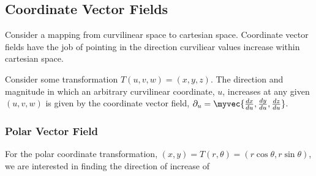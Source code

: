 \documentclass[11pt]{article}
\newenvironment{mybox}
{\begin{tcolorbox}[colback=red!5!white,colframe=red!75!black]}
{\end{tcolorbox}}
\begin{document}
\subsection{Coordinate Vector Fields}
Consider a mapping from curvilinear space to cartesian space. Coordinate vector fields have the job of pointing in the direction curviliear values increase within cartesian space.
\begin{mybox}
    Consider some transformation $T(u,v,w)=(x,y,z)$. The direction and magnitude in which an arbitrary curvilinear coordinate, $u$, increases at any given $(u,v,w)$ is given by the coordinate vector field, $\partial_u = \myvec{\frac{dx}{du},\frac{dy}{du},\frac{dz}{du}}$.
\end{mybox}
\subsubsection{Polar Vector Field}
For the polar coordinate transformation, $(x,y)=T(r,\theta)=(r\cos{\theta},r\sin{\theta})$, we are interested in finding the direction of increase of 
\end{document}
